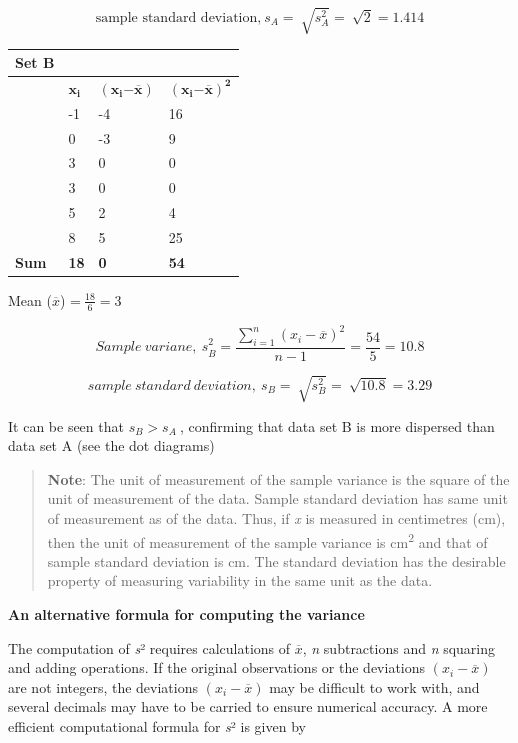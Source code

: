 \documentclass[
]{book}
\begin{document}
\[\text{sample standard deviation,}\ s_{A} = \ \sqrt{s_{A}^{2}} = \ \sqrt{2} = 1.414\]

\begin{longtable}[]{@{}llll@{}}
\toprule
\textbf{Set B} & & & \\
\midrule
\endhead
& \(\mathbf{x}_{\mathbf{i}}\) & \(\left( \mathbf{x}_{\mathbf{i}}\mathbf{-}\overline{\mathbf{x}} \right)\) & \(\left( \mathbf{x}_{\mathbf{i}}\mathbf{-}\overline{\mathbf{x}} \right)^{\mathbf{2}}\) \\
& -1 & -4 & 16 \\
& 0 & -3 & 9 \\
& 3 & 0 & 0 \\
& 3 & 0 & 0 \\
& 5 & 2 & 4 \\
& 8 & 5 & 25 \\
\textbf{Sum} & \textbf{18} & \textbf{0} & \textbf{54} \\
\bottomrule
\end{longtable}

Mean (\(\overline{x}\)) =\(\ \frac{18}{6} = 3\)

\[{Sample\ variane,\ s}_{B}^{2} = \frac{\sum_{i = 1}^{n}\left( x_{i} - \overline{x} \right)^{2}}{n - 1} = \frac{54}{5} = 10.8\]

\[sample\ standard\ deviation,\ s_{B} = \ \sqrt{s_{B}^{2}} = \ \sqrt{10.8} = 3.29\]

It can be seen that \(s_{B} > s_{A}\ \), confirming that data set B is
more dispersed than data set A (see the dot diagrams)

\begin{quote}
\textbf{Note}: The unit of measurement of the sample variance is the square
of the unit of measurement of the data. Sample standard deviation has
same unit of measurement as of the data. Thus, if \emph{x} is measured in
centimetres (cm), then the unit of measurement of the sample variance is
cm\textsuperscript{2} and that of sample standard deviation is cm. The standard
deviation has the desirable property of measuring variability in the
same unit as the data.
\end{quote}

\textbf{An alternative formula for computing the variance}

The computation of \emph{s}² requires calculations of \(\overline{x}\), \emph{n}
subtractions and \emph{n} squaring and adding operations. If the original
observations or the deviations \(\left( x_{i} - \overline{x} \right)\) are
not integers, the deviations \(\left( x_{i} - \overline{x} \right)\) may
be difficult to work with, and several decimals may have to be carried
to ensure numerical accuracy. A more efficient computational formula for
\emph{s}² is given by
\end{document}
